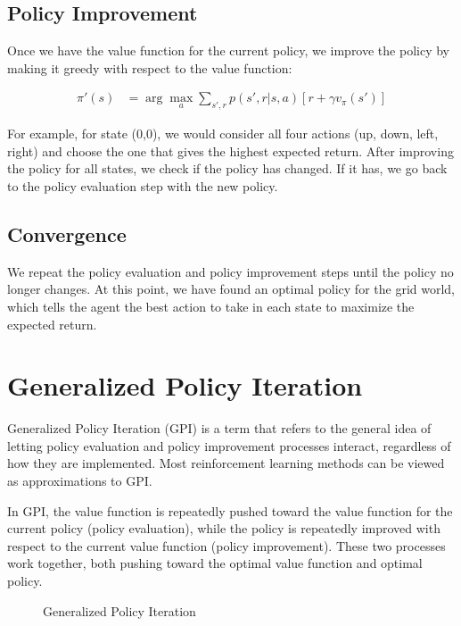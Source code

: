 \documentclass{article}
\begin{document}
\subsection{Policy Improvement}

Once we have the value function for the current policy, we improve the policy by making it greedy with respect to the value function:

\begin{align*}
\pi'(s) &= \arg\max_a \sum_{s',r} p(s',r|s,a)[r + \gamma v_\pi(s')]
\end{align*}

For example, for state (0,0), we would consider all four actions (up, down, left, right) and choose the one that gives the highest expected return. After improving the policy for all states, we check if the policy has changed. If it has, we go back to the policy evaluation step with the new policy.

\subsection{Convergence}

We repeat the policy evaluation and policy improvement steps until the policy no longer changes. At this point, we have found an optimal policy for the grid world, which tells the agent the best action to take in each state to maximize the expected return.

\section{Generalized Policy Iteration}

Generalized Policy Iteration (GPI) is a term that refers to the general idea of letting policy evaluation and policy improvement processes interact, regardless of how they are implemented. Most reinforcement learning methods can be viewed as approximations to GPI.

In GPI, the value function is repeatedly pushed toward the value function for the current policy (policy evaluation), while the policy is repeatedly improved with respect to the current value function (policy improvement). These two processes work together, both pushing toward the optimal value function and optimal policy.

\begin{figure}[h]
\centering
{}
\caption{Generalized Policy Iteration}
\end{figure}
\end{document}
